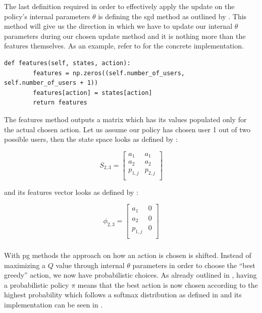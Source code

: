  The last definition required in order to effectively apply the update on the policy's internal parameters $\theta$ is defining the \gls{sgd} method as outlined by . This method will give us the direction in which we have to update our internal $\theta$ parameters during our chosen update method and it is nothing more than the features themselves. As an example, refer to  for the concrete implementation.

 \begin{lstlisting}[caption=Features definition,label=lst:features_definition,style=CustomPython]
    def features(self, states, action):
        features = np.zeros((self.number_of_users, self.number_of_users + 1))
        features[action] = states[action]
        return features
\end{lstlisting}

The features method outputs a matrix which has its values populated only for the actual chosen action. Let us assume our policy has chosen user 1 out of two possible users, then the state space looks as defined by :

\begin{equation}
\label{eq:kbatch_sp_ex}
	S_{2,3} = 
	\begin{bmatrix}
	a_1 & a_1 \\
	a_2 & a_2 \\
	p_{1,j} & p_{2,j} \\
	\end{bmatrix}
\end{equation}

and its features vector looks as defined by :

\begin{equation}
\label{eq:kbatch_features_ex}
	\phi_{2,3} = 
	\begin{bmatrix}
	a_1 & 0 \\
	a_2 & 0 \\
	p_{1,j} & 0 \\
	\end{bmatrix}
\end{equation}

\subsubsection{}

With \gls{pg} methods the approach on how an action is chosen is shifted. Instead of maximizing a $Q$ value through internal $\theta$ parameters in order to choose the ``best greedy'' action, we now have probabilistic choices. As already outlined in , having a probabilistic policy $\pi$ means that the best action is now chosen according to the highest probability which follows a softmax distribution as defined in  and its implementation can be seen in .


